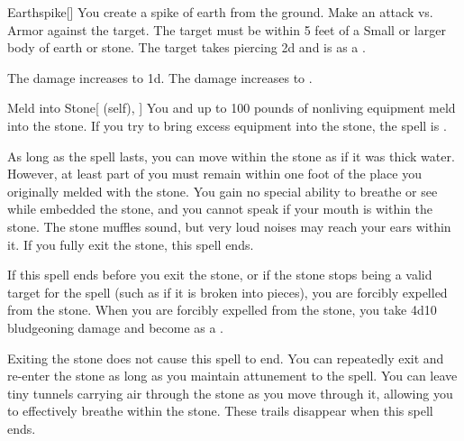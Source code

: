\lowercase{\hypertarget{spell:Earthspike}{}}\label{spell:Earthspike}
\begin{freeability}[Rank 3]{\hypertarget{spell:Earthspike}{Earthspike}}[]
You create a spike of earth from the ground.
Make an attack vs. Armor against the target.
The target must be within 5 feet of a Small or larger body of earth or stone.
\hit The target takes piercing  \minus2d and is  as a .

\rankline
{} The damage increases to  \minus1d.
 The damage increases to .

\end{freeability}
\vspace{0.25em}



\lowercase{\hypertarget{spell:Meld into Stone}{}}\label{spell:Meld into Stone}
\begin{attuneability}[Rank 3]{\hypertarget{spell:Meld into Stone}{Meld into Stone}}[ (self), ]
You and up to 100 pounds of nonliving equipment meld into the stone.
If you try to bring excess equipment into the stone, the spell is .

As long as the spell lasts, you can move within the stone as if it was thick water.
However, at least part of you must remain within one foot of the place you originally melded with the stone.
You gain no special ability to breathe or see while embedded the stone, and you cannot speak if your mouth is within the stone.
The stone muffles sound, but very loud noises may reach your ears within it.
If you fully exit the stone, this spell ends.

If this spell ends before you exit the stone, or if the stone stops being a valid target for the spell (such as if it is broken into pieces), you are forcibly expelled from the stone.
When you are forcibly expelled from the stone, you take 4d10 bludgeoning damage and become  as a .

\rankline
{} Exiting the stone does not cause this spell to end.
You can repeatedly exit and re-enter the stone as long as you maintain attunement to the spell.
 You can leave tiny tunnels carrying air through the stone as you move through it, allowing you to effectively breathe within the stone.
These trails disappear when this spell ends.

\end{attuneability}
\vspace{0.25em}



